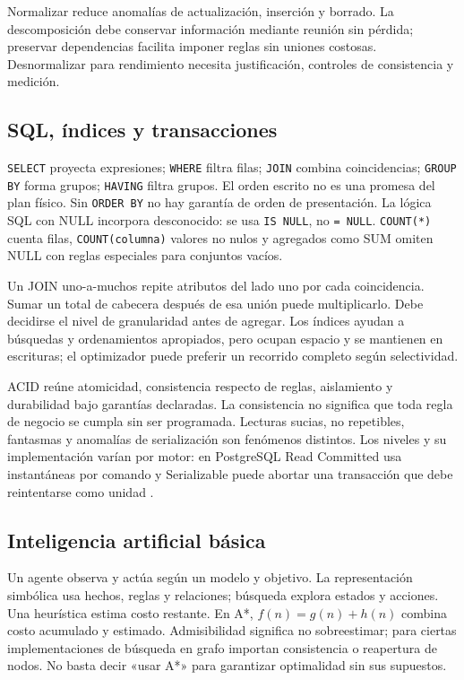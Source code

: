 Normalizar reduce anomalías de actualización, inserción y borrado. La descomposición debe conservar información mediante reunión sin pérdida; preservar dependencias facilita imponer reglas sin uniones costosas. Desnormalizar para rendimiento necesita justificación, controles de consistencia y medición.

\subsection{SQL, índices y transacciones}
\texttt{SELECT} proyecta expresiones; \texttt{WHERE} filtra filas; \texttt{JOIN} combina coincidencias; \texttt{GROUP BY} forma grupos; \texttt{HAVING} filtra grupos. El orden escrito no es una promesa del plan físico. Sin \texttt{ORDER BY} no hay garantía de orden de presentación. La lógica SQL con NULL incorpora desconocido: se usa \texttt{IS NULL}, no \texttt{= NULL}. \texttt{COUNT(*)} cuenta filas, \texttt{COUNT(columna)} valores no nulos y agregados como SUM omiten NULL con reglas especiales para conjuntos vacíos.

Un JOIN uno-a-muchos repite atributos del lado uno por cada coincidencia. Sumar un total de cabecera después de esa unión puede multiplicarlo. Debe decidirse el nivel de granularidad antes de agregar. Los índices ayudan a búsquedas y ordenamientos apropiados, pero ocupan espacio y se mantienen en escrituras; el optimizador puede preferir un recorrido completo según selectividad.

ACID reúne atomicidad, consistencia respecto de reglas, aislamiento y durabilidad bajo garantías declaradas. La consistencia no significa que toda regla de negocio se cumpla sin ser programada. Lecturas sucias, no repetibles, fantasmas y anomalías de serialización son fenómenos distintos. Los niveles y su implementación varían por motor: en PostgreSQL Read Committed usa instantáneas por comando y Serializable puede abortar una transacción que debe reintentarse como unidad \cite[capítulo 13, especialmente 13.2]{postgres}.

\subsection{Inteligencia artificial básica}
Un agente observa y actúa según un modelo y objetivo. La representación simbólica usa hechos, reglas y relaciones; búsqueda explora estados y acciones. Una heurística estima costo restante. En A*, $f(n)=g(n)+h(n)$ combina costo acumulado y estimado. Admisibilidad significa no sobreestimar; para ciertas implementaciones de búsqueda en grafo importan consistencia o reapertura de nodos. No basta decir «usar A*» para garantizar optimalidad sin sus supuestos.

